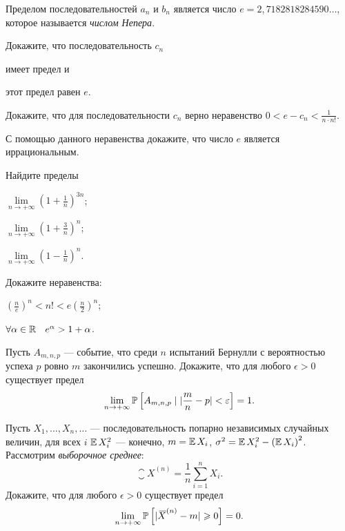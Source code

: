 \documentclass[a4paper, 12pt, num=31]{listok}
\begin{document}
\begin{definition}
    Пределом последовательностей $a_n$ и $b_n$ является число $e = 2{,}7182818284590\dots$, которое называется \textit{числом Непера}.
\end{definition}
\begin{problem}
    Докажите, что последовательность $c_n$
    \begin{probparts}
        \item имеет предел и 
        \item этот предел равен $e$.
    \end{probparts}
\end{problem}
\begin{problem}[\hard]
\begin{probparts}
    \item Докажите, что для последовательности $c_n$ верно неравенство $0 < e - c_n < \frac1{n\cdot n!}$.
    \item С помощью данного неравенства докажите, что число $e$ является иррациональным.
\end{probparts}
\end{problem}
\begin{problem}
    Найдите пределы
    \begin{probparts}
        \item $\lim\limits_{n \to + \infty} {\left ( 1 + \frac 1n \right )}^{3n}$;
        \item $\lim\limits_{n \to + \infty} {\left ( 1 + \frac 3n \right )}^{n}$;
        \item $\lim\limits_{n \to + \infty} {\left ( 1 - \frac 1n \right )}^{n}$.
    \end{probparts}
\end{problem}
\begin{problem}
    Докажите неравенства:
    \begin{probparts}
        \item ${\left ( \frac n e \right )}^n < n! < e {\left ( \frac n2 \right )}^n$;
        \item $\forall{\alpha \in \R} e^\alpha > 1 + \alpha$.
    \end{probparts}
\end{problem}
\begin{problem}
    Пусть $A_{m, n, p}$ --- событие, что среди $n$ испытаний Бернулли с вероятностью успеха $p$ ровно $m$ закончились успешно.
    Докажите, что для любого $\epsilon > 0$ существует предел
    \[
        \lim_{n \to + \infty} \mathbb{P}\left [ A_{m, n, p} \mid |\frac mn - p| < \varepsilon \right ] = 1.
    \]
\end{problem}
\begin{problem}
    Пусть $X_1, \dots, X_n, \dots$ --- последовательность попарно независимых случайных величин,
    для всех $i$ $\operatorname{\mathbb{E}}{X_i^2}$ --- конечно, $m = \operatorname{\mathbb{E}}{X_i}$, $\sigma^2 = \operatorname{\mathbb{E}}{X_i^2} - {(\operatorname{\mathbb{E}}{X_i})}^2$.
    Рассмотрим \textit{выборочное среднее}:
    \[
        {\closure{X}}^{(n)} = \frac 1n \sum_{i = 1}^n X_i.
    \]
    Докажите, что для любого $\epsilon > 0$ существует предел
    \[
        \lim_{n \to +\infty} \mathbb{P}\left [ |{{}\mkern3mu\overline{\mkern-3muX}}^{(n)} - m| \geqslant 0 \right ] = 0.
    \]
\end{problem}
\end{document}
